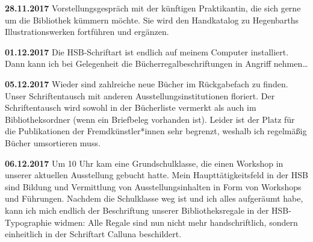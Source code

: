 \documentclass[a4paper,
fontsize=11pt,
oneside,
numbers=noperiodatend,
parskip=half-,
bibliography=totoc,
final
]{scrartcl}
\begin{document}
\textbf{28.11.2017} Vorstellungsgespräch mit der künftigen Praktikantin,
die sich gerne um die Bibliothek kümmern möchte. Sie wird den
Handkatalog zu Hegenbarths Illustrationswerken fortführen und ergänzen.

\textbf{01.12.2017} Die HSB-Schriftart ist endlich auf meinem Computer
installiert. Dann kann ich bei Gelegenheit die Bücherregalbeschriftungen
in Angriff nehmen\ldots{}

\textbf{05.12.2017} Wieder sind zahlreiche neue Bücher im Rückgabefach
zu finden. Unser Schriftentausch mit anderen Ausstellungsinstitutionen
floriert. Der Schriftentausch wird sowohl in der Bücherliste vermerkt
als auch im Bibliotheksordner (wenn ein Briefbeleg vorhanden ist).
Leider ist der Platz für die Publikationen der Fremdkünstler*innen sehr
begrenzt, weshalb ich regelmäßig Bücher umsortieren muss.

\textbf{06.12.2017} Um 10 Uhr kam eine Grundschulklasse, die einen
Workshop in unserer aktuellen Ausstellung gebucht hatte. Mein
Haupttätigkeitsfeld in der HSB sind Bildung und Vermittlung von
Ausstellungsinhalten in Form von Workshops und Führungen. Nachdem die
Schulklasse weg ist und ich alles aufgeräumt habe, kann ich mich endlich
der Beschriftung unserer Bibliotheksregale in der HSB-Typographie
widmen: Alle Regale sind nun nicht mehr handschriftlich, sondern
einheitlich in der Schriftart Calluna beschildert.
\end{document}
